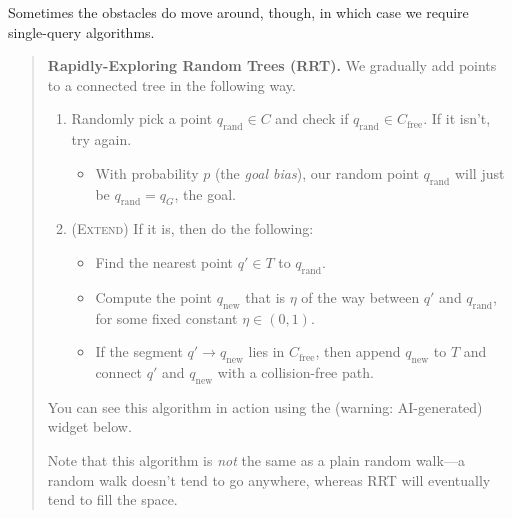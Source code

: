 Sometimes the obstacles do move around, though,
in which case we require single-query algorithms.

\begin{quote}
    \textbf{Rapidly-Exploring Random Trees (RRT).}
    We gradually add points to a connected tree
    in the following way.
    \begin{enumerate}
        \item Randomly pick a point $q_{\mathrm{rand}} \in C$
        and check if $q_{\mathrm{rand}} \in C_{\mathrm{free}}$.
        If it isn't, try again.
        \begin{itemize}
            \item With probability $p$ (the \emph{goal bias}),
            our random point $q_{\mathrm{rand}}$
            will just be $q_{\mathrm{rand}} = q_G$,
            the goal.
        \end{itemize}
        \item (\textsc{Extend})
        If it is, then do the following:
        \begin{itemize}
            \item Find the nearest point $q' \in T$ to $q_{\mathrm{rand}}$.
            \item Compute the point $q_{\mathrm{new}}$
            that is $\eta$ of the way between $q'$ and $q_{\mathrm{rand}}$,
            for some fixed constant $\eta \in (0, 1)$.
            \item If the segment $q' \to q_{\mathrm{new}}$ lies in $C_{\mathrm{free}}$,
            then append $q_{\mathrm{new}}$ to $T$
            and connect $q'$ and $q_{\mathrm{new}}$ with
            a collision-free path.
        \end{itemize}
    \end{enumerate}
    You can see this algorithm in action
    using the (warning: AI-generated) widget below.


    Note that this algorithm is \emph{not} the same
    as a plain random walk---a random walk
    doesn't tend to go anywhere,
    whereas RRT will eventually tend to fill the space.


\end{quote}
